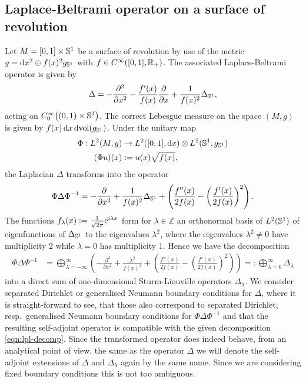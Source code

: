 \subsection{Laplace-Beltrami operator on a surface of revolution}
Let $M = [0,1]\times\Sphere{1}$ be a surface of revolution by use of the metric
$g = \mathrm dx^2 \oplus f(x)^2 g_\Sphere{1}$ with $f\in \Cinf([0,1],
\Rplus)$. The associated Laplace-Beltrami operator is given by
\begin{align}
  \Delta = -\frac{\partial^2}{\partial x^2} -
            \frac{f'(x)}{f(x)}\frac{\partial}{\partial x} +
            \frac{1}{f(x)^2}\Delta_\Sphere1,
\end{align}
acting on $\Cinf[0]\bigl((0,1)\times\Sphere1\bigr)$. The correct Lebesgue
measure on the space $(M,g)$ is given by $f(x)\,\mathrm dx\, \mathrm
d\!\vol(g_\Sphere1)$. Under the unitary map
\begin{align*}
  \Phi: L^2(M, g)&\to L^2([0,1], \mathrm dx)\otimes L^2(\Sphere1, g_\Sphere1) \\
     (\Phi u)(x) &:= u(x) \sqrt{f(x)},
\end{align*}
the Laplacian $\Delta$ transforms into the operator
\begin{align*}
  \Phi\Delta\Phi^{-1} = -\frac{\partial}{\partial x^2} +
  \frac{1}{f(x)^2}\Delta_\Sphere1 + \left( \frac{f''(x)}{2f(x)} -
  \left(\frac{f'(x)}{2f(x)}\right)^2\right).
\end{align*}
The functions $f_\lambda(x) := \frac{1}{\sqrt{2\pi}}\Eto{\mathrm i\lambda x}$
form for $\lambda\in\mathbb{Z}$ an orthonormal basis of $L^2(\Sphere1)$ of
eigenfunctions of $\Delta_\Sphere1$ to the eigenvalues $\lambda^2$, where the
eigenvalues $\lambda^2 \neq 0$ have multiplicity 2 while $\lambda = 0$ has
multiplicity 1. Hence we have the decomposition
\begin{align}
  \label{eqn:lpl-decomp}
  \Phi\Delta\Phi^{-1} &= \bigoplus_{\lambda=-\infty}^{\infty} \left(
    -\frac{\partial^2}{\partial x^2} + \frac{\lambda^2}{f(x)^2} + 
     \left( \frac{f''(x)}{2f(x)} -
     \left(\frac{f'(x)}{2f(x)}\right)^2\right)\right)
     =: \bigoplus_{\lambda=0}^{\infty}\Delta_\lambda
\end{align}
into a direct sum of one-dimensional Sturm-Liouville operators $\Delta_\lambda$.
We consider separated Dirichlet or generalised Neumann boundary conditions for
$\Delta$, where it is straight-forward to see, that those also correspond to
separated Dirichlet, resp.\ generalised Neumann boundary conditions for
$\Phi\Delta\Phi^{-1}$ and that the resulting self-adjoint operator is compatible
with the given decomposition \eqref{eqn:lpl-decomp}. Since the transformed
operator does indeed behave, from an analytical point of view, the same as the
operator $\Delta$ we will denote the self-adjoint extensions of $\Delta$ and
$\Delta_\lambda$ again by the same name. Since we are considering fixed boundary
conditions this is not too ambiguous.

